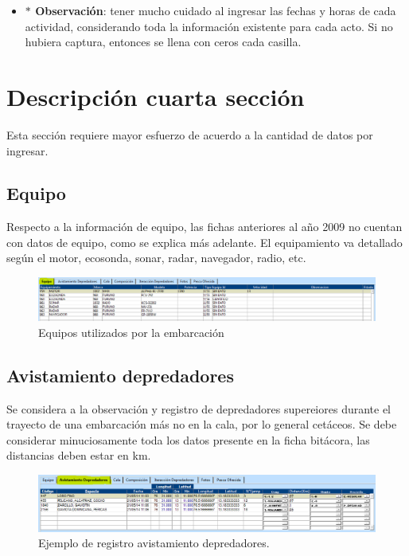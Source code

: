 \documentclass[a4paper,oneside,11pt]{book}
\begin{document}
\begin{itemize}
\item [] \textbf{$\ast$ Observación}: tener mucho cuidado al ingresar las fechas y horas de cada actividad, considerando toda la información existente para cada acto. Si no hubiera captura, entonces se llena con ceros cada casilla.
\end{itemize}

\section{Descripción cuarta sección } 
Esta sección requiere mayor esfuerzo de acuerdo a la cantidad de datos por ingresar. 
\subsection{Equipo} 
Respecto a la información de equipo, las fichas anteriores al año 2009 no cuentan con datos de equipo, como se explica más adelante. El equipamiento va detallado según el motor, ecosonda, sonar, radar, navegador, radio, etc. 
\begin{figure}
\centering
\includegraphics[width=1\linewidth]{./imagen_Manual_PBP/equipo}
\caption{Equipos utilizados por la embarcación}
\label{fig:equipo}
\end{figure}

\subsection{Avistamiento depredadores}

Se considera a la observación y registro de depredadores supereiores durante el trayecto de una embarcación más no en la cala, por lo general cetáceos. Se debe considerar minuciosamente toda los datos presente en la ficha bitácora, las distancias deben estar en km.

\begin{figure}
\centering
\includegraphics[width=1\linewidth]{./imagen_Manual_PBP/avista}
\caption{Ejemplo de registro avistamiento depredadores.}
\label{fig:avista}
\end{figure}
\end{document}
